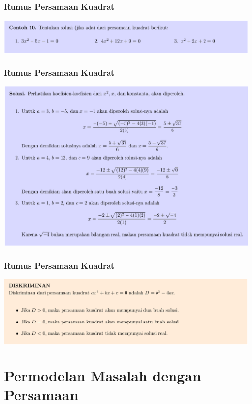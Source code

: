 \documentclass[pdflatex,compress,mathserif]{beamer}
\begin{document}
\begin{frame}
	\frametitle{Rumus Persamaan Kuadrat}
	\begin{center}
		\includegraphics[width=\linewidth]{img/img21}
	\end{center}
\end{frame}

\begin{frame}
	\frametitle{Rumus Persamaan Kuadrat}
	\begin{center}
		\includegraphics[width=\linewidth]{img/img22}
	\end{center}
\end{frame}

\begin{frame}
	\frametitle{Rumus Persamaan Kuadrat}
	\begin{center}
		\includegraphics[width=\linewidth]{img/img23}
	\end{center}
\end{frame}

\section{Permodelan Masalah dengan Persamaan}
\end{document}
